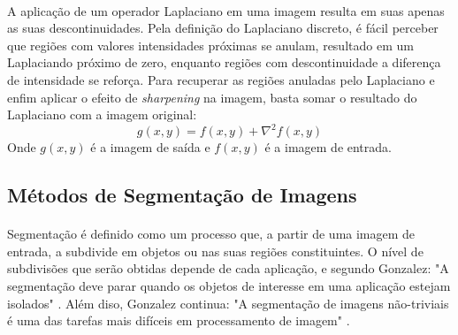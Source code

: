 \paragraph{}A aplicação de um operador Laplaciano em uma imagem resulta em suas apenas as suas descontinuidades. Pela definição do Laplaciano discreto, é fácil perceber que regiões com valores intensidades próximas se anulam, resultado em um Laplaciando próximo de zero, enquanto regiões com descontinuidade a diferença de intensidade se reforça. Para recuperar as regiões anuladas pelo Laplaciano e enfim aplicar o efeito de \textit{sharpening} na imagem, basta somar o resultado do Laplaciano com a imagem original:
\[ 
        g(x,y) = f(x,y) + \nabla^{2}f(x,y) 
\] 
\noindent{}Onde \(g(x,y)\) é a imagem de saída e \(f(x,y)\) é a imagem de entrada.


\subsection{Métodos de Segmentação de Imagens}

\paragraph{}Segmentação é definido como um processo que, a partir de uma imagem de entrada, a subdivide em objetos ou nas suas regiões constituintes. O nível de subdivisões que serão obtidas depende de cada aplicação, e segundo Gonzalez: "A segmentação deve parar quando os objetos de interesse em uma aplicação estejam isolados" \cite{Gonzalez92}. Além diso, Gonzalez continua: "A segmentação de imagens não-triviais é uma das tarefas mais difíceis em processamento de imagem" \cite{Gonzalez92}.
